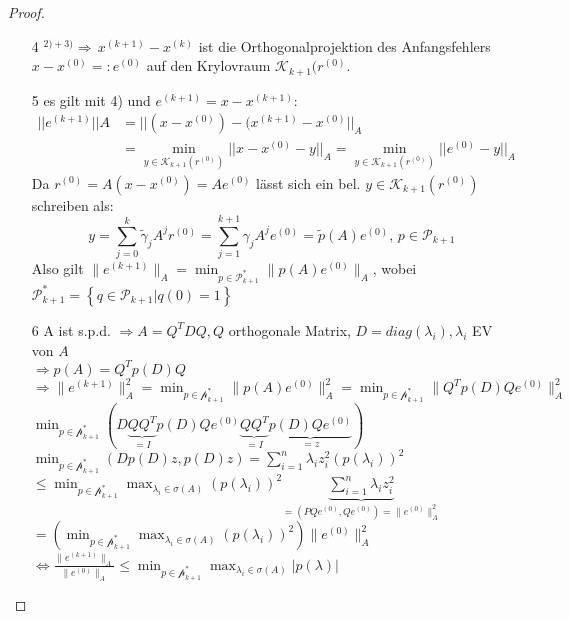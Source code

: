 \begin{proof}
\begin{enumerate}[(1)]
    \item[4] $^{2) + 3)} \Rightarrow \, x^{(k+1)}-x^{(k)}$ ist die Orthogonalprojektion des Anfangsfehlers $ x-x^{(0)} =: e^{(0)}$ auf den Krylovraum $\mathcal{K}_{k+1}(r^{(0)}$.\\

    \item[5] es gilt mit 4) und $e^{(k+1)}=x-x^{(k+1)}$:
        \begin{align*}
          ||e^{(k+1)}||A &= || (x-x^{(0)})-(x^{(k+1)} -x^{(0)} ||_A \\
          &= \min_{y \in \mathcal{K}_{k+1}(r^{(0)})} ||x-x^{(0)} - y ||_A = \min_{y \in \mathcal{K}_{k+1}(r^{(0)})} ||e^{(0)} - y ||_A 
        \end{align*}
        Da $r^{(0)} =A(x-x^{(0)})=Ae^{(0)}$  lässt sich ein bel. $y \in \mathcal{K}_{k+1}(r^{(0)})$ schreiben als:
        \[ y= \sum_{j=0}^k \tilde \gamma_j A^jr^{(0)} = \sum_{j=1}^{k+1}\gamma_j A^j e^{(0)} = \tilde p (A)e^{(0)}, \,  p \in \mathcal{P}_{k+1} \]
        Also gilt $\|e^{(k+1)}\|_A = \min_{p\in \mathcal{P}^*_{k+1}} \|p(A)e^{(0)}\|_A$, wobei $\mathcal{P}^*_{k+1}=\left\{ q\in \mathcal{P}_{k+1} | q(0)=1 \right\}$

    \item[6] A ist s.p.d. $\Rightarrow A=Q^TDQ, Q$ orthogonale Matrix, $D=diag(\lambda_i), \lambda_i$ EV von $A$\\
      $\Rightarrow p(A) = Q^Tp(D)Q$\\
      $\Rightarrow \|e^{(k+1)}\|^2_A = \min_{p\in \mathcal{p}^*_{k+1}} \|p(A)e^{(0)}\|_A^2 
      =  \min_{p\in \mathcal{p}^*_{k+1}} \|Q^Tp(D)Qe^{(0)}\|_A^2 $\\
      $ \min_{p\in \mathcal{p}^*_{k+1}} \left( D\underbrace{QQ^T}_{=I}p(D)Qe^{(0)}\underbrace{QQ^T}_{=I} \underbrace{p(D)Qe^{(0)}}_{=z} \right)$\\
      $  \min_{p\in \mathcal{p}^*_{k+1}} (Dp(D)z,p(D)z) = \sum_{i=1}^{n}\lambda_i z_i^2(p(\lambda_i))^2$\\
      $\leq  \min_{p\in \mathcal{p}^*_{k+1}} \max_{\lambda_i \in \sigma(A)} (p(\lambda_i))^2 \underbrace{\sum_{i=1}^{n}\lambda_i z_i^2}_{=(PQe^{(0)},Qe^{(0)})=\|e^{(0)}\|_A^2}$
      $= \left(  \min_{p\in \mathcal{p}^*_{k+1}}  \max_{\lambda_i \in \sigma(A)} (p(\lambda_i))^2 \right) \|e^{(0)}\|_A^2$\\
      $\Leftrightarrow \frac{\|e^{(k+1)}\|_A}{\|e^{(0)}\|_A} 
      \leq  \min_{p\in \mathcal{p}^*_{k+1}}  \max_{\lambda_i \in \sigma(A)} |p(\lambda)|$


\end{enumerate}
\end{proof}
